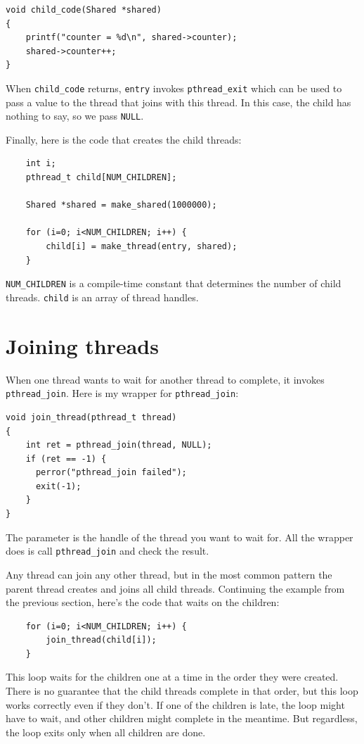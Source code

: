 \documentclass[12pt]{book}
\begin{document}
{\begin{verbatim}
void child_code(Shared *shared)
{  
    printf("counter = %d\n", shared->counter);
    shared->counter++;
}
\end{verbatim}

When {\tt child\_code} returns, {\tt entry} invokes
\verb"pthread_exit" which can be used to pass a value to the thread
that joins with this thread.  In this case, the child has nothing to
say, so we pass {\tt NULL}.

Finally, here is the code that creates the child threads:

\begin{verbatim}
    int i;
    pthread_t child[NUM_CHILDREN];

    Shared *shared = make_shared(1000000);

    for (i=0; i<NUM_CHILDREN; i++) {
        child[i] = make_thread(entry, shared);
    }
\end{verbatim}

\verb"NUM_CHILDREN" is a compile-time constant that determines
the number of child threads.  {\tt child} is an array of
thread handles.


\section{Joining threads}

When one thread wants to wait for another thread to complete,
it invokes {\tt pthread\_join}.
Here is my wrapper for {\tt pthread\_join}:

\begin{verbatim}
void join_thread(pthread_t thread)
{
    int ret = pthread_join(thread, NULL);
    if (ret == -1) {
      perror("pthread_join failed");
      exit(-1);
    }
}
\end{verbatim}

The parameter is the handle of the thread you want to wait for.
All the wrapper does is call {\tt pthread\_join} and check the
result.

Any thread can join any other thread, but in the most common pattern
the parent thread creates and joins all child threads.
Continuing the example from the previous section, here's the
code that waits on the children:

\begin{verbatim}
    for (i=0; i<NUM_CHILDREN; i++) {
        join_thread(child[i]);
    }
\end{verbatim}

This loop waits for the children one at a time in the order they
were created.  There is no guarantee that the child threads complete 
in that order, but this loop works correctly even if they don't.  If one
of the children is late, the loop might have to wait, and other children
might complete in the meantime.  But regardless, the loop exits
only when all children are done.

}
\end{document}
